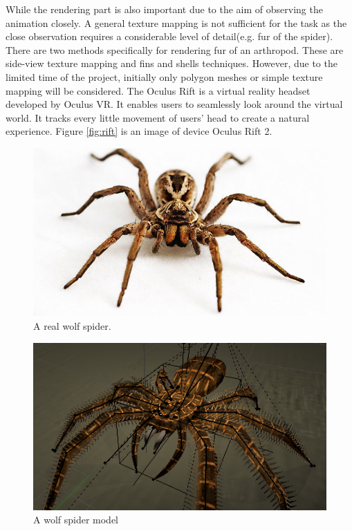 While the rendering part is also important due to the aim of observing the animation closely. A general texture mapping is not sufficient for the task as the close observation requires a considerable level of detail(e.g. fur of the spider). There are two methods specifically for rendering fur of an arthropod. These are side-view texture mapping and fins and shells techniques\cite{fur}. However, due to the limited time of the project, initially only polygon meshes or simple texture mapping will be considered.
The Oculus Rift is a virtual reality headset developed by Oculus VR. It enables users to seamlessly look around the virtual world. It tracks every little movement of users' head to create a natural experience. Figure \ref{fig:rift} is an image of device Oculus Rift 2.



\begin{figure}[htb!]
\centering
\includegraphics[width=14cm]{figures/realSpider.png}
\caption{A real wolf spider. \protect\footnotemark}
\label{fig:realSpider}
\end{figure}


\begin{figure}[htb!]
\centering
\includegraphics[width=13cm]{figures/spiderModel.png}
\caption{A wolf spider model  \protect\footnotemark}
\label{fig:spiderModel}
\end{figure}

